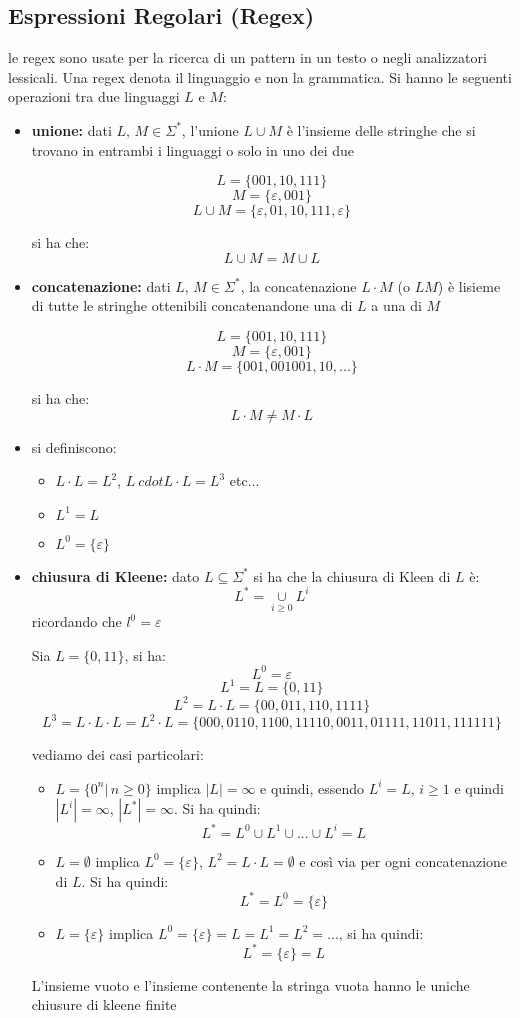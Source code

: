 \documentclass[a4paper,12pt, oneside]{book}
\begin{document}
\subsection{Espressioni Regolari (Regex)}
le regex sono usate per la ricerca di un pattern in un testo o negli analizzatori lessicali. Una regex denota il linguaggio e non la grammatica. Si hanno le seguenti operazioni tra due linguaggi $L$ e $M$:
\begin{itemize}
\item \textbf{unione:} dati $L,\, M\in \Sigma^*$, l'unione $L\cup M$ è l'insieme delle stringhe che si trovano in entrambi i linguaggi o solo in uno dei due
\begin{esempio}
$$L=\{001,10,111\}$$
$$M=\{\varepsilon,001\}$$
$$L\cup M=\{\varepsilon,01,10,111,\varepsilon\}$$
\end{esempio}
si ha che:
$$L\cup M=M\cup L$$
\item \textbf{concatenazione:} dati $L,\, M\in \Sigma^*$, la concatenazione $L\cdot M$ (o $LM$) è lisieme di tutte le stringhe ottenibili concatenandone una di $L$ a una di $M$
\begin{esempio}
$$L=\{001,10,111\}$$
$$M=\{\varepsilon,001\}$$
$$L\cdot M=\{001,001001,10,...\}$$
\end{esempio}
si ha che:
$$L\cdot M\neq M\cdot L$$
\item si definiscono:
\begin{itemize}
\item $L\cdot L=L^2$, $L\ cdot L\cdot L=L^3$ etc...
\item $L^1=L$
\item $L^0=\{\varepsilon\}$
\end{itemize}
\item \textbf{chiusura di Kleene:} dato $L\subseteq \Sigma^*$ si ha che la chiusura di Kleen di $L$ è:
$$L^*=\underset{i\geq 0}{\cup}L^i$$
ricordando che $l^0=\varepsilon$
\begin{esempio}
Sia $L=\{0,11\}$, si ha:
$$L^0=\varepsilon$$
$$L^1=L=\{0,11\}$$
$$L^2=L\cdot L=\{00,011,110,1111\}$$
$$L^3=L\cdot L\cdot L=L^2\cdot L=\{000,0110,1100,11110,0011,01111,11011,111111\}$$
\end{esempio}
vediamo dei casi particolari:
\begin{itemize}
\item $L=\{0^n|\,n\geq 0\}$ implica $|L|=\infty$ e quindi, essendo $L^i=L,\, i\geq 1$ e quindi $|L^i|=\infty$, $|L^*|=\infty$. Si ha quindi:
$$L^*=L^0\cup L^1\cup ... \cup L^i=L$$
\item $L=\emptyset$ implica $L^0=\{\varepsilon\}$, $L^2=L\cdot L=\emptyset$ e così via per ogni concatenazione di $L$. Si ha quindi:
$$L^*=L^0=\{\varepsilon\}$$
\item $L=\{\varepsilon\}$ implica $L^0=\{\varepsilon\}=L=L^1=L^2=...$, si ha quindi:
$$L^*=\{\varepsilon\}=L$$
\end{itemize}
L'insieme vuoto e l'insieme contenente la stringa vuota hanno le uniche chiusure di kleene finite
\end{itemize}
\end{document}
